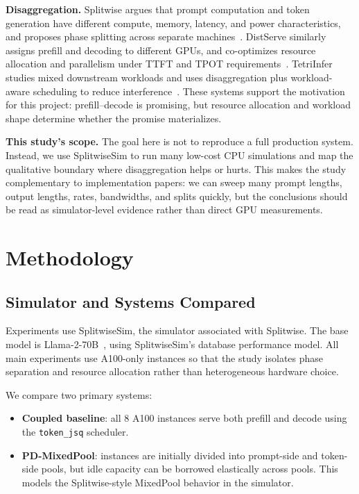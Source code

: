 \documentclass[10pt]{article}
\newcommand{\pd}{prefill--decode}
\begin{document}
\textbf{Disaggregation.} Splitwise argues that prompt computation and token generation have different compute, memory, latency, and power characteristics, and proposes phase splitting across separate machines~\citep{splitwise2024}. DistServe similarly assigns prefill and decoding to different GPUs, and co-optimizes resource allocation and parallelism under TTFT and TPOT requirements~\citep{distserve2024}. TetriInfer studies mixed downstream workloads and uses disaggregation plus workload-aware scheduling to reduce interference~\citep{tetriinfer2024}. These systems support the motivation for this project: \pd{} is promising, but resource allocation and workload shape determine whether the promise materializes.

\textbf{This study's scope.} The goal here is not to reproduce a full production system. Instead, we use SplitwiseSim to run many low-cost CPU simulations and map the qualitative boundary where disaggregation helps or hurts. This makes the study complementary to implementation papers: we can sweep many prompt lengths, output lengths, rates, bandwidths, and splits quickly, but the conclusions should be read as simulator-level evidence rather than direct GPU measurements.

\section{Methodology}
\subsection{Simulator and Systems Compared}
Experiments use SplitwiseSim, the simulator associated with Splitwise. The base model is Llama-2-70B~\citep{llama2}, using SplitwiseSim's database performance model. All main experiments use A100-only instances so that the study isolates phase separation and resource allocation rather than heterogeneous hardware choice.

We compare two primary systems:
\begin{itemize}
  \item \textbf{Coupled baseline}: all 8 A100 instances serve both prefill and decode using the \texttt{token\_jsq} scheduler.
  \item \textbf{PD-MixedPool}: instances are initially divided into prompt-side and token-side pools, but idle capacity can be borrowed elastically across pools. This models the Splitwise-style MixedPool behavior in the simulator.
\end{itemize}
\end{document}
